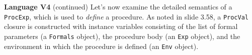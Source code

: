 \begin{minipage}[t]{\sw}
\slidenumber
\LARGE
{\bf Language V4} (continued)\exx
Let's now examine the detailed semantics of a \verb'ProcExp',
which is used to {\em define} a procedure.\exx
\Large
\emm{}\exx
\LARGE
As noted in slide 3.58,
a \verb'ProcVal' closure is constructed
with instance variables consisting of
the list of formal parameters (a \verb'Formals' object),
the procedure body (an \verb'Exp' object),
and the environment in which the procedure is defined
(an \verb'Env' object).\exx
\end{minipage}

